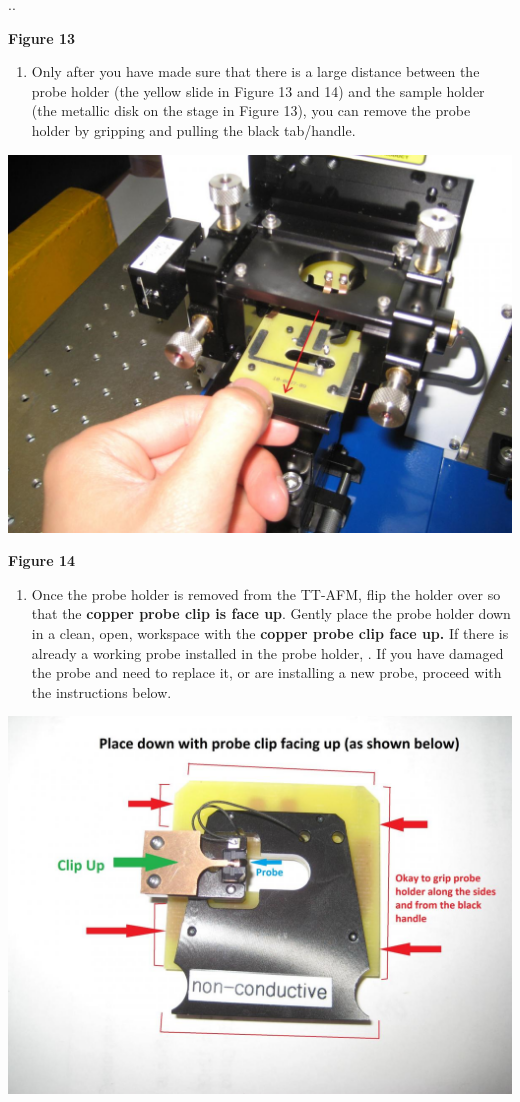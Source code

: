 \documentclass{../lab}
\begin{document}
..

\textbf{Figure 13}

\begin{enumerate}
    \item Only after you have made sure that there is a large distance between the probe holder (the yellow slide in Figure 13 and 14) and the sample holder (the metallic disk on the stage in Figure 13), you can remove the probe holder by gripping and pulling the black tab/handle.

\end{enumerate}


\begin{center}
    \href{http://experimentationlab.berkeley.edu/sites/default/files/AFMImages/14.JPG}{\includegraphics[width=0.5\linewidth]{images/14.JPG}}
\end{center}

\textbf{Figure 14}

\begin{enumerate}
    \item Once the probe holder is removed from the TT-AFM, flip the holder over so that the \textbf{copper probe clip is face up}.  Gently place the probe holder down in a clean, open, workspace with the \textbf{copper probe clip face up.  }If there is already a working probe installed in the probe holder, \textbf{}.  If you have damaged the probe and need to replace it, or are installing a new probe, proceed with the instructions below.

\end{enumerate}


\begin{center}
    \href{http://experimentationlab.berkeley.edu/sites/default/files/AFMImages/15.JPG}{\includegraphics[width=0.5\linewidth]{images/15.JPG}}
\end{center}
\end{document}
